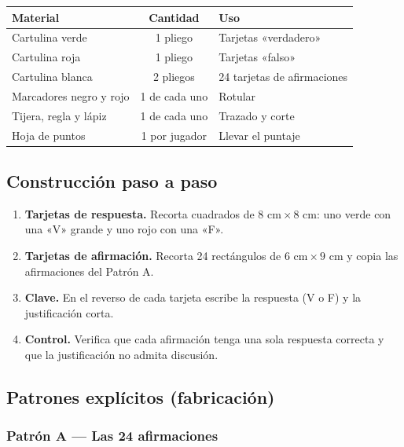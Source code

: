 \documentclass[12pt, letterpaper]{article}
\begin{document}
\begin{center}
\small
\begin{tabular}{@{}p{5.0cm} c p{7.4cm}@{}}
\toprule
\textbf{Material} & \textbf{Cantidad} & \textbf{Uso}\\
\midrule
Cartulina verde & 1 pliego & Tarjetas «verdadero»\\
Cartulina roja & 1 pliego & Tarjetas «falso»\\
Cartulina blanca & 2 pliegos & 24 tarjetas de afirmaciones\\
Marcadores negro y rojo & 1 de cada uno & Rotular\\
Tijera, regla y lápiz & 1 de cada uno & Trazado y corte\\
Hoja de puntos & 1 por jugador & Llevar el puntaje\\
\bottomrule
\end{tabular}
\end{center}

\subsection{Construcción paso a paso}

\begin{enumerate}[leftmargin=*]
  \item \textbf{Tarjetas de respuesta.} Recorta cuadrados de $8\text{ cm}\times 8\text{ cm}$: uno verde con una «V» grande y uno rojo con una «F».
  \item \textbf{Tarjetas de afirmación.} Recorta 24 rectángulos de $6\text{ cm}\times 9\text{ cm}$ y copia las afirmaciones del Patrón A.
  \item \textbf{Clave.} En el reverso de cada tarjeta escribe la respuesta (V o F) y la justificación corta.
  \item \textbf{Control.} Verifica que cada afirmación tenga una sola respuesta correcta y que la justificación no admita discusión.
\end{enumerate}

\subsection{Patrones explícitos (fabricación)}

\subsubsection{Patrón A — Las 24 afirmaciones}
\end{document}
